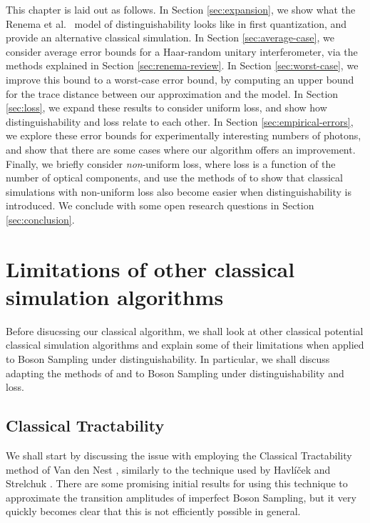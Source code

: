 This chapter is laid out as follows.
In Section \ref{sec:expansion}, we show what the Renema et al.~\cite{renema2018, renema2018loss} model of distinguishability looks like in first quantization, and provide an alternative classical simulation. 
In Section \ref{sec:average-case}, we consider average error bounds for a Haar-random unitary interferometer, via the methods explained in Section \ref{sec:renema-review}. 
In Section \ref{sec:worst-case}, we improve this bound to a worst-case error bound, by computing an upper bound for the trace distance between our approximation and the model. 
In Section \ref{sec:loss}, we expand these results to consider uniform loss, and show how distinguishability and loss relate to each other. 
In Section \ref{sec:empirical-errors}, we explore these error bounds for experimentally interesting numbers of photons, and show that there are some cases where our algorithm offers an improvement. 
Finally, we briefly consider \emph{non}-uniform loss, where loss is a function of the number of optical components, and use the methods of \cite{garciapatron2017, oszmaniec2018} to show that classical simulations with non-uniform loss also become easier when distinguishability is introduced.
We conclude with some open research questions in Section \ref{sec:conclusion}.

\section{Limitations of other classical simulation algorithms}

Before disucssing our classical algorithm, we shall look at other classical potential classical simulation algorithms and explain some of their limitations when applied to Boson Sampling under distinguishability. In particular, we shall discuss adapting the methods of \cite{havlicek2018, havlicek2019} and \cite{oszmaniec2018} to Boson Sampling under distinguishability and loss.

\subsection{Classical Tractability}

We shall start by discussing the issue with employing the Classical Tractability method of Van den Nest \cite{vandennest2011}, similarly to the technique used by Havl\'{i}\v{c}ek and Strelchuk \cite{havlicek2018}. There are some promising initial results for using this technique to approximate the transition amplitudes of imperfect Boson Sampling, but it very quickly becomes clear that this is not efficiently possible in general.

